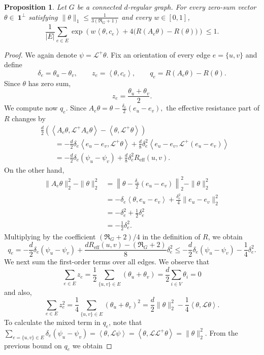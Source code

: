 \documentclass[10pt,a4paper]{amsart}
\newtheorem{proposition}{Proposition}
\newcommand{\ip}[2]{\left\langle #1,#2\right\rangle}
\begin{document}
\begin{proposition}
\label{prop:one-step}
Let \(G\) be a connected \(d\)-regular graph. For every zero-sum vector \(\theta\in\ \mathbf 1 ^\perp \) satisfying \(\|\theta\|_1 \le \frac{1}{3(\Re_G+1)}\)
and every \(w\in[0,1]\),
\[
\frac1{|E|}
\sum_{e\in E}
\exp\left(
 w\ip{\theta}{c_e}
+
4\bigl(R(A_e\theta)-R(\theta)\bigr)
\right)
\le1.
\]
\end{proposition}

\begin{proof}
We again denote \(
\psi=\mathcal L^+\theta.\)
Fix an orientation of every edge \(e=\{u,v\}\) and define
\[
\delta_e=\theta_u-\theta_v,
\qquad
z_e=\ip{\theta}{c_e}, \qquad q_e
=
R(A_e\theta)-R(\theta).
\]
Since \(\theta\) has zero sum,
\[
z_e
=
\frac{\theta_u+\theta_v}{2}.
\]
We compute now \(q_e\). Since
\(
A_e\theta
=
\theta-\frac{\delta_e}{2}(e_u-e_v),
\)
the effective resistance part of \(R\) changes by
\[
\begin{aligned}
&\frac d2
\left(
\ip{A_e\theta}{\mathcal L^+A_e\theta}
-
\ip{\theta}{\mathcal L^+\theta}
\right)\\
&\qquad=
-\frac d2\delta_e
\ip{e_u-e_v}{\mathcal L^+\theta}
+
\frac d8\delta_e^2
\ip{e_u-e_v}{\mathcal L^+(e_u-e_v)}\\
&\qquad=
-\frac d2\delta_e(\psi_u-\psi_v)
+
\frac d8\delta_e^2R_{\mathrm{eff}}(u,v).
\end{aligned}
\]
On the other hand,
\[
\begin{aligned}
\|A_e\theta\|_2^2-\|\theta\|_2^2
&=
\left\|
\theta-\frac{\delta_e}{2}(e_u-e_v)
\right\|_2^2
-
\|\theta\|_2^2\\
&=
-\delta_e\ip{\theta}{e_u-e_v}
+
\frac{\delta_e^2}{4}\|e_u-e_v\|_2^2\\
&=
-\delta_e^2+
\frac12\delta_e^2\\
&=
-\frac12\delta_e^2.
\end{aligned}
\]
Multiplying by the coefficient \((\Re_G+2)/4\) in the definition of \(R\), we obtain
\[
q_e
=
-\frac d2\delta_e(\psi_u-\psi_v)
+
\frac{dR_{\mathrm{eff}}(u,v)-(\Re_G+2)}{8}\delta_e^2 
\le
-\frac d2\delta_e(\psi_u-\psi_v)
-
\frac{1}{4}\delta_e^2.
\]
We next sum the first-order terms over all edges. We observe that
\[
\sum_{e\in E}z_e
=
\frac12
\sum_{\{u,v\}\in E}
(\theta_u+\theta_v)
=
\frac d2\sum_{i\in V}\theta_i
=
0
\]
and also,
\[
\sum_{e\in E}z_e^2
=
\frac14
\sum_{\{u,v\}\in E}
(\theta_u+\theta_v)^2
=
\frac d2\|\theta\|_2^2
-
\frac14\ip{\theta}{\mathcal L\theta}.
\]
To calculate the mixed term in \(q_e\), note that
\(
\sum_{e=\{u,v\}\in E} \delta_{e}(\psi_u-\psi_v)=\ip{\theta}{\mathcal L\psi}=\ip{\theta}{\mathcal L \mathcal L^+ \theta}=\|\theta\|_2^2.\) From the previous bound on $q_e$ we obtain

\end{proof}
\end{document}
